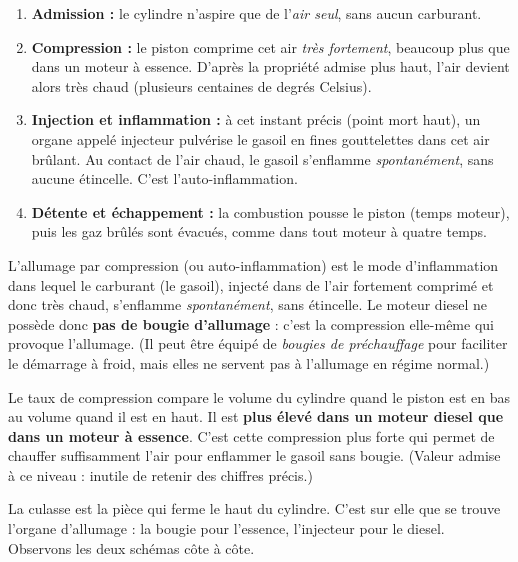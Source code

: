 \documentclass[11pt]{article}
\newcommand{\cle}[1]{{\popxbold\color{popdark}#1}}
\newcounter{popsec}
\newcounter{popsub}
\newcommand{\courssub}[1]{%
  \stepcounter{popsub}%
  \par\vspace{9pt}\noindent{\popxbold\fontsize{11.5}{13}\selectfont\color{popink}{\color{poporange}\thepopsec.\thepopsub}\hspace{6pt}#1}\par\nopagebreak\vspace{4pt}
}
\begin{document}
\begin{enumerate}
\item \textbf{Admission :} le cylindre n'aspire que de l'\emph{air seul}, sans aucun carburant.
\item \textbf{Compression :} le piston comprime cet air \emph{très fortement}, beaucoup plus que dans un moteur à essence. D'après la propriété admise plus haut, l'air devient alors très chaud (plusieurs centaines de degrés Celsius).
\item \textbf{Injection et inflammation :} à cet instant précis (point mort haut), un organe appelé \cle{injecteur} pulvérise le gasoil en fines gouttelettes dans cet air brûlant. Au contact de l'air chaud, le gasoil s'enflamme \emph{spontanément}, sans aucune étincelle. C'est l'\cle{auto-inflammation}.
\item \textbf{Détente et échappement :} la combustion pousse le piston (temps moteur), puis les gaz brûlés sont évacués, comme dans tout moteur à quatre temps.
\end{enumerate}

\begin{definition}
L'\cle{allumage par compression} (ou auto-inflammation) est le mode d'inflammation dans lequel le carburant (le gasoil), injecté dans de l'air fortement comprimé et donc très chaud, s'enflamme \emph{spontanément}, sans étincelle. Le moteur diesel ne possède donc \textbf{pas de bougie d'allumage} : c'est la compression elle-même qui provoque l'allumage. (Il peut être équipé de \emph{bougies de préchauffage} pour faciliter le démarrage à froid, mais elles ne servent pas à l'allumage en régime normal.)
\end{definition}

\begin{aretenir}
Le \cle{taux de compression} compare le volume du cylindre quand le piston est en bas au volume quand il est en haut. Il est \textbf{plus élevé dans un moteur diesel que dans un moteur à essence}. C'est cette compression plus forte qui permet de chauffer suffisamment l'air pour enflammer le gasoil sans bougie. (Valeur admise à ce niveau : inutile de retenir des chiffres précis.)
\end{aretenir}

\courssub{Schéma comparatif des deux culasses}

La \cle{culasse} est la pièce qui ferme le haut du cylindre. C'est sur elle que se trouve l'organe d'allumage : la bougie pour l'essence, l'injecteur pour le diesel. Observons les deux schémas côte à côte.
\end{document}
